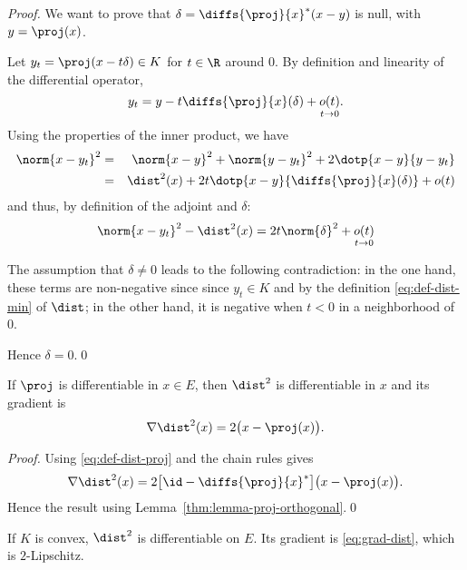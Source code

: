 \begin{proof}
  We want to prove that $\delta=\diffs{\proj}{x}^*(x-y)$ is null, with $y=\proj(x)$.

  Let $y_t = \proj(x-t\delta) \in K$ for $t\in\R$ around $0$.
  By definition and linearity of the differential operator,
  \begin{equation*}
    y_t = y - t \diffs{\proj}{x}(\delta) + \underset{t\rightarrow 0}{o(t)}.
  \end{equation*}
  Using the properties of the inner product, we have
  \begin{eqnarray*}
    \norm{x-y_t}^2
      &=& \norm{x-y}^2 + \norm{y-y_t}^2 + 2\dotp{x-y}{y-y_t} \\
      &=& \dist^2(x) + 2t\dotp{x-y}{\diffs{\proj}{x}(\delta)} + o(t)
  \end{eqnarray*}
  and thus, by definition of the adjoint and $\delta$:
  \begin{equation*}
    \norm{x-y_t}^2 - \dist^2(x) = 2t\norm{\delta}^2 + \underset{t\rightarrow 0}{o(t)}
  \end{equation*}

  The assumption that $\delta\neq 0$ leads to the following contradiction:
  in the one hand, these terms are non-negative since since $y_t\in K$ and by the definition \eqref{eq:def-dist-min} of $\dist$;
  in the other hand, it is negative when $t<0$ in a neighborhood of $0$.

  Hence $\delta=0$.\qed
\end{proof}

\begin{theorem}
  \label{thm:dist-diff}
  If $\proj$ is differentiable in $x\in E$,
  then $\dist^2$ is differentiable in $x$ and its gradient is
  \begin{equation}
    \label{eq:grad-dist}
    \nabla\dist^2(x)=2\big(x-\proj(x)\big).
  \end{equation}
\end{theorem}

\begin{proof}
  Using \eqref{eq:def-dist-proj} and the chain rules gives
  \begin{equation*}
    \nabla\dist^2(x)=2\big[\id-\diffs{\proj}{x}^*\big]\big(x-\proj(x)\big).
  \end{equation*}
  Hence the result using Lemma~\ref{thm:lemma-proj-orthogonal}.\qed
\end{proof}

\begin{proposition}
  If $K$ is convex, $\dist^2$ is differentiable on $E$.
  Its gradient is \eqref{eq:grad-dist}, which is $2$-Lipschitz.
\end{proposition}

